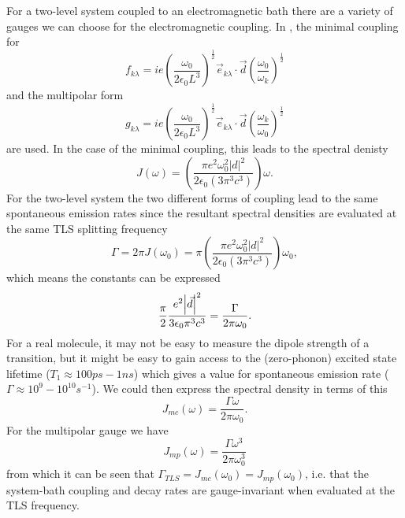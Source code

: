\documentclass[]{article}
\begin{document}
For a two-level system coupled to an electromagnetic bath there are a variety of gauges we can choose for the electromagnetic coupling. In \cite{Stokes2012}, the minimal coupling for
\begin{equation}
\label{eq:MinimalCouplingConst}
f_{k\lambda} = i e \left(\frac{\omega_0}{2\epsilon_0 L^3}\right)^{\frac{1}{2}} \vec{e}_{k \lambda}\cdot\vec{d} \left(\frac{\omega_0}{\omega_k}\right)^{\frac{1}{2}} 
\end{equation}
and the multipolar form
\begin{equation}
\label{eq:MultipolarCouplingConst}
g_{k\lambda} = i e \left(\frac{\omega_0}{2\epsilon_0 L^3}\right)^{\frac{1}{2}} \vec{e}_{k \lambda}\cdot\vec{d} \left(\frac{\omega_k}{\omega_0}\right)^{\frac{1}{2}} 
\end{equation}
are used. 
In the case of the minimal coupling, this leads to the spectral denisty
\begin{equation}
J(\omega) = \left(\frac{\pi e^2\omega_0^2 |d|^2}{2\epsilon_0(3\pi^3 c^3)}\right)\omega.
\end{equation}
For the two-level system the two different forms of coupling lead to the same spontaneous emission rates since the resultant spectral densities are evaluated at the same TLS splitting frequency
\begin{equation}
\label{eq:TLS_decay}
\Gamma = 2\pi J(\omega_0) = \pi\left(\frac{\pi e^2\omega_0^2 |d|^2}{2\epsilon_0(3\pi^3 c^3)}\right)\omega_0,
\end{equation}
which means the constants can be expressed
\begin{equation}
\frac{\pi}{2} \frac{e^2\abs{\vec{d}}^2}{3\epsilon_0\pi^3c^3} = \frac{\Gamma}{2\pi\omega_0}.
\end{equation}
For a real molecule, it may not be easy to measure the dipole strength of a transition, but it might be easy to gain access to the (zero-phonon) excited state lifetime ($T_1 \approx 100ps - 1ns$) which gives a value for spontaneous emission rate ($\Gamma\approx 10^9-10^{10}s^{-1}$). We could then express the spectral density in terms of this
\begin{equation}
\label{eq:MinimalSpectral}
J_{mc}(\omega) = \frac{\Gamma\omega}{2\pi\omega_0}.
\end{equation}
For the multipolar gauge we have
\begin{equation}
\label{eq:MultipolarSpectral}
J_{mp}(\omega) = \frac{\Gamma\omega^3}{2\pi\omega_0^3}
\end{equation}
from which it can be seen that $\Gamma_{TLS}=J_{mc}(\omega_0)=J_{mp}(\omega_0)$, i.e. that the system-bath coupling and decay rates are gauge-invariant when evaluated at the TLS frequency.
\end{document}
